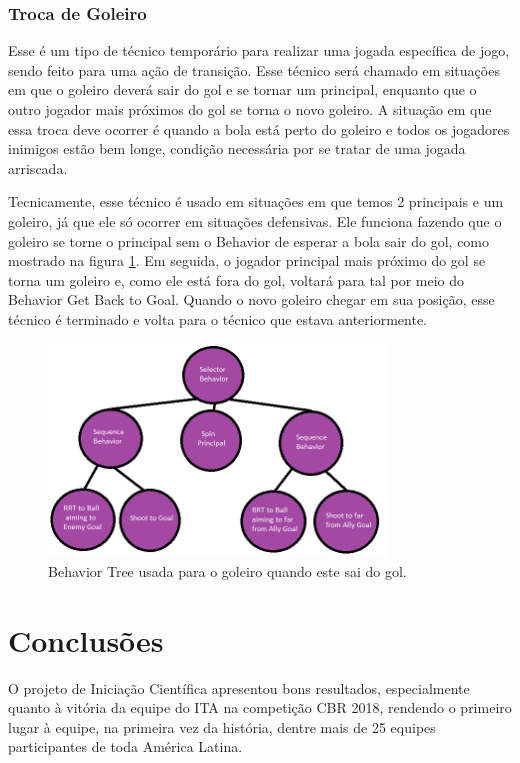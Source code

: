 \documentclass[a4paper,12pt]{article}
\begin{document}
\subsubsection{Troca de Goleiro} Esse é um tipo de técnico temporário para realizar uma jogada específica de jogo, sendo feito para uma ação de transição. Esse técnico será chamado em situações em que o goleiro deverá sair do gol e se tornar um principal, enquanto que o outro jogador mais próximos do gol se torna o novo goleiro. A situação em que essa troca deve ocorrer é quando a bola está perto do goleiro e todos os jogadores inimigos estão bem longe, condição necessária por se tratar de uma jogada arriscada.

Tecnicamente, esse técnico é usado em situações em que temos 2 principais e um goleiro, já que ele só ocorrer em situações defensivas. Ele funciona fazendo que o goleiro se torne o principal sem o Behavior de esperar a bola sair do gol, como mostrado na figura \ref{fig:OutOfGoal_BT}. Em seguida, o jogador principal mais próximo do gol se torna um goleiro e, como ele está fora do gol, voltará para tal por meio do Behavior Get Back to Goal. Quando o novo goleiro chegar em sua posição, esse técnico é terminado e volta para o técnico que estava anteriormente.

\begin{figure}[H]
	\centering
	\includegraphics[width=0.8\textwidth]{figures/LastGoalierOutOfGoal.png}
   	\caption{Behavior Tree usada para o goleiro quando este sai do gol.} \label{fig:OutOfGoal_BT}
\end{figure}


\section{Conclusões}

O projeto de Iniciação Científica apresentou bons resultados, especialmente quanto à vitória da equipe do ITA na competição CBR 2018, rendendo o primeiro lugar à equipe, na primeira vez da história, dentre mais de 25 equipes participantes de toda América Latina.
\end{document}
